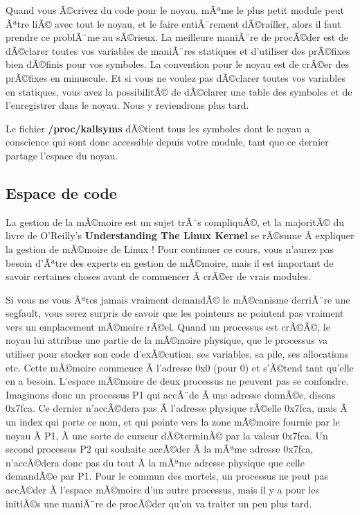 \documentclass[11pt]{article}
\begin{document}
Quand vous Ã©crivez du code pour le noyau, mÃªme le plus petit module peut Ãªtre liÃ© avec tout le noyau, et le faire entiÃ¨rement dÃ©railler, alors il faut prendre ce problÃ¨me au sÃ©rieux. La meilleure maniÃ¨re de procÃ©der est de dÃ©clarer toutes vos variables de maniÃ¨res statiques et d'utiliser des prÃ©fixes bien dÃ©finis pour vos symboles. La convention pour le noyau est de crÃ©er des prÃ©fixes en minuscule. Et si vous ne voulez pas dÃ©clarer toutes vos variables en statiques, vous avez la possibilitÃ© de dÃ©clarer une table des symboles et de l'enregistrer dans le noyau. Nous y reviendrons plus tard.

Le fichier \textbf{/proc/kallsyms} dÃ©tient tous les symboles dont le noyau a conscience qui sont donc accessible depuis votre module, tant que ce dernier partage l'espace du noyau.

\subsection*{Espace de code}
\label{sec-5-5}

La gestion de la mÃ©moire est un sujet trÃ¨s compliquÃ©, et la majoritÃ© du livre de O'Reilly's \textbf{Understanding The Linux Kernel} se rÃ©sume Ã  expliquer la gestion de mÃ©moire de Linux ! Pour continuer ce cours, vous n'aurez pas besoin d'Ãªtre des experts en gestion de mÃ©moire, mais il est important de savoir certaines choses avant de commencer Ã  crÃ©er de vrais modules.

Si vous ne vous Ãªtes jamais vraiment demandÃ© le mÃ©canisme derriÃ¨re une segfault, vous serez surpris de savoir que les pointeurs ne pointent pas vraiment vers un emplacement mÃ©moire rÃ©el. Quand un processus est crÃ©Ã©, le noyau lui attribue une partie de la mÃ©moire physique, que le processus va utiliser pour stocker son code d'exÃ©cution, ses variables, sa pile, ses allocations etc. Cette mÃ©moire commence Ã  l'adresse 0x0 (pour 0) et s'Ã©tend tant qu'elle en a besoin. L'espace mÃ©moire de deux processus ne peuvent pas se confondre. Imaginons donc un processus P1 qui accÃ¨de Ã  une adresse donnÃ©e, disons 0x7fca. Ce dernier n'accÃ©dera pas Ã  l'adresse physique rÃ©elle 0x7fca, mais Ã  un index qui porte ce nom, et qui pointe vers la zone mÃ©moire fournie par le noyau Ã  P1, Ã  une sorte de curseur dÃ©terminÃ© par la valeur 0x7fca. Un second processus P2 qui souhaite accÃ©der Ã  la mÃªme adresse 0x7fca, n'accÃ©dera donc pas du tout Ã  la mÃªme adresse physique que celle demandÃ©e par P1. Pour le commun des mortels, un processus ne peut pas accÃ©der Ã  l'espace mÃ©moire d'un autre processus, mais il y a pour les initiÃ©s une maniÃ¨re de procÃ©der qu'on va traiter un peu plus tard.
\end{document}
